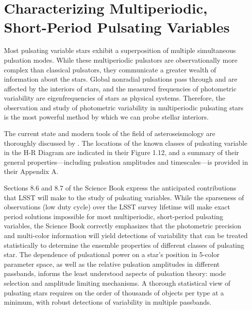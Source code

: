 %
%

\section{Characterizing Multiperiodic, Short-Period Pulsating Variables}
\def\secname{multiperiodicvariables}\label{sec:\secname}


Most pulsating variable stars exhibit a superposition of multiple
simultaneous pulsation modes.  While these multiperiodic pulsators are
observationally more complex than classical pulsators, they communicate
a greater wealth of information about the stars.  Global nonradial
pulsations pass through and are affected by the interiors of stars, and
the measured frequencies of photometric variability are eigenfrequencies
of stars as physical systems.  Therefore, the observation and study of
photometric variability in multiperiodic pulsating stars is the most
powerful method by which we can probe stellar interiors.

The current state and modern tools of the field of asteroseismology are
thoroughly discussed by \citet{2010aste.book.....A}.  The locations of
the known classes of pulsating variable in the H-R Diagram are indicated
in their Figure 1.12, and a summary of their general
properties---including pulsation amplitudes and timescales---is provided
in their Appendix A.

Sections 8.6 and 8.7 of the Science Book express the anticipated
contributions that LSST will make to the study of pulsating variables.
While the sparseness of observations (low duty cycle) over the LSST
survey lifetime will make exact period solutions impossible for most
multiperiodic, short-period pulsating variables, the Science Book
correctly emphasizes that the photometric precision and multi-color
information will yield detections of variability that can be treated
statistically to determine the ensemble properties of different classes
of pulsating star.  The dependence of pulsational power on a star's
position in 5-color parameter space, as well as the relative pulsation
amplitudes in different passbands, informs the least understood aspects
of pulsation theory: mode selection and amplitude limiting mechanisms. A
thorough statistical view of pulsating stars requires on the order of
thousands of objects per type at a minimum, with robust detections of
variability in multiple passbands.

